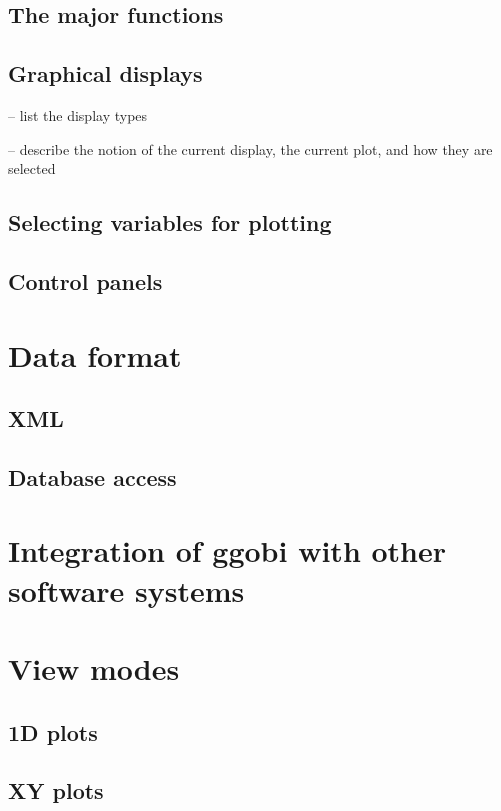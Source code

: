 \documentclass[11pt]{article}
\begin{document}
\subsection{The major functions}

\subsection{Graphical displays}
\label{slbl:GraphicalDisplays}   %

-- list the display types

-- describe the notion of the current display, the current plot,
and how they are selected

\subsection{Selecting variables for plotting}
\subsection{Control panels}

\section{Data format}
\label{slbl:DataFormat}
\subsection {XML}
\label{slbl:XML}
\subsection {Database access}
\label{slbl:MySQL}

\section{Integration of ggobi with other software systems}
\label{slbl:Integration}

\section{View modes}

\subsection{1D plots}
\subsection{XY plots}
\end{document}
